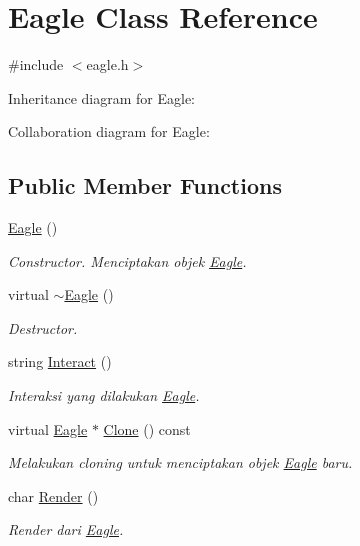 \hypertarget{classEagle}{}\section{Eagle Class Reference}
\label{classEagle}


{\ttfamily \#include $<$eagle.\+h$>$}



Inheritance diagram for Eagle\+:


Collaboration diagram for Eagle\+:
\subsection*{Public Member Functions}
\begin{DoxyCompactItemize}
\item 
\hyperlink{classEagle_a8b205e5b26bece07d18b852b042851fe}{Eagle} ()
\begin{DoxyCompactList}\small\item\em Constructor. Menciptakan objek \hyperlink{classEagle}{Eagle}. \end{DoxyCompactList}\item 
virtual \hyperlink{classEagle_a530318b3eb744ad26c9060d61aa314fe}{$\sim$\+Eagle} ()
\begin{DoxyCompactList}\small\item\em Destructor. \end{DoxyCompactList}\item 
string \hyperlink{classEagle_a64abae4f80bcdcba7dac9f03126f42aa}{Interact} ()
\begin{DoxyCompactList}\small\item\em Interaksi yang dilakukan \hyperlink{classEagle}{Eagle}. \end{DoxyCompactList}\item 
virtual \hyperlink{classEagle}{Eagle} $\ast$ \hyperlink{classEagle_ace8cb419354688615938d2a53d5c1566}{Clone} () const 
\begin{DoxyCompactList}\small\item\em Melakukan cloning untuk menciptakan objek \hyperlink{classEagle}{Eagle} baru. \end{DoxyCompactList}\item 
char \hyperlink{classEagle_a34e512cb19b5ba1f8a7bce937c57f33f}{Render} ()
\begin{DoxyCompactList}\small\item\em Render dari \hyperlink{classEagle}{Eagle}. \end{DoxyCompactList}\end{DoxyCompactItemize}
